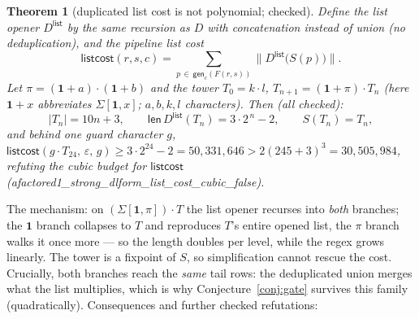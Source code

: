 \documentclass[11pt]{article}
\newtheorem{theorem}{Theorem}
\theoremstyle{remark}
\newcommand{\ONE}{\mathbf{1}}
\newcommand{\rs}[1]{\lvert #1\rvert}                 %
\newcommand{\rssb}[1]{\bigl\lVert #1\bigr\rVert}      %
\newcommand{\Fact}{F}
\newcommand{\Sstrong}{S}
\newcommand{\open}{D}
\newcommand{\gen}{\mathsf{gen}}
\newcommand{\Dlist}{D^{\mathsf{list}}}
\newcommand{\listcost}{\mathsf{listcost}}
\newcommand{\thy}[1]{\textsf{\small #1}}
\begin{document}
\begin{theorem}[duplicated list cost is not polynomial; checked]\label{thm:listcost}
Define the \emph{list} opener $\Dlist$ by the same recursion as $\open$ with
concatenation instead of union (no deduplication), and the pipeline list cost
\[
\listcost(r,s,c)=\!\!\sum_{p\,\in\,\gen_c(\Fact(r,s))}\!\!
  \rssb{\Dlist\bigl(\Sstrong(p)\bigr)} .
\]
Let $\pi=(\ONE+a)\cdot(\ONE+b)$ and the tower
$T_0=k\cdot l$, $T_{n+1}=(\ONE+\pi)\cdot T_n$ (here $\ONE+x$ abbreviates
$\Sigma[\ONE,x]$; $a,b,k,l$ characters).  Then (all checked):
\[
\rs{T_n}=10n+3,\qquad
\mathsf{len}\,\Dlist(T_n)=3\cdot 2^{\,n}-2,\qquad
\Sstrong(T_n)=T_n,
\]
and behind one guard character $g$,
$\listcost(g\cdot T_{24},\,\varepsilon,\,g)\ge 3\cdot 2^{24}-2
 = 50{,}331{,}646 > 2(245+3)^{3}=30{,}505{,}984$,
refuting the cubic budget for $\listcost$
\hfill(\thy{afactored1\_strong\_dlform\_list\_cost\_cubic\_false}).
\end{theorem}

The mechanism: on $(\Sigma[\ONE,\pi])\cdot T$ the list opener recurses into
\emph{both} branches; the $\ONE$ branch collapses to $T$ and reproduces $T$'s
entire opened list, the $\pi$ branch walks it once more --- so the length
doubles per level, while the regex grows linearly.  The tower is a fixpoint
of $\Sstrong$, so simplification cannot rescue the cost.  Crucially, both
branches reach the \emph{same} tail rows: the deduplicated union merges what
the list multiplies, which is why Conjecture~\ref{conj:gate} survives this
family (quadratically).  Consequences and further checked refutations:
\end{document}
